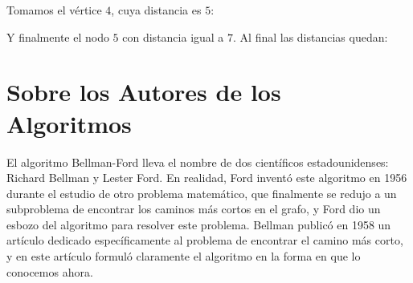 \documentclass[a4paper, 10pt]{article}
\numberwithin{theoremCounter}{subsection}
\numberwithin{problemCounter}{subsection}
\numberwithin{defCounter}{subsection}
\numberwithin{obsCounter}{subsection}
\numberwithin{methCounter}{subsection}
\numberwithin{exampleCounter}{subsection}
\numberwithin{propCounter}{subsection}
\theoremstyle{violetnumbox}
\theoremstyle{blacknumex}
\begin{document}
\begin{multicols}{2}
    Tomamos el v\'ertice $4$, cuya distancia es $5$:


    Y finalmente el nodo $5$ con distancia igual a $7$. Al final las distancias quedan:









\section{Sobre los Autores de los Algoritmos}
    El algoritmo Bellman-Ford lleva el nombre de dos científicos estadounidenses: Richard Bellman y Lester Ford. En realidad, Ford inventó este algoritmo en 1956 durante el estudio de otro problema matemático, que finalmente se redujo a un subproblema de encontrar los caminos más cortos en el grafo, y Ford dio un esbozo del algoritmo para resolver este problema. Bellman publicó en 1958 un artículo dedicado específicamente al problema de encontrar el camino más corto, y en este artículo formuló claramente el algoritmo en la forma en que lo conocemos ahora.

\end{multicols}
\end{document}
